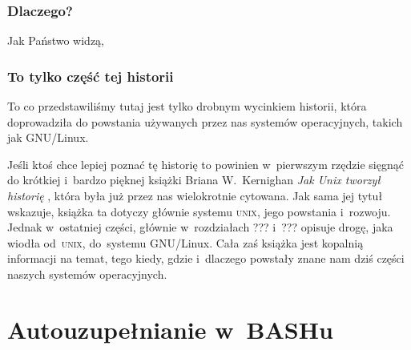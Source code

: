 \documentclass[10pt,t]{beamer}
\begin{document}
\begin{frame}
  \frametitle{Dlaczego?}


  Jak Państwo widzą,

\end{frame}





\begin{frame}
  \frametitle{To tylko część tej historii}


  To co przedstawiliśmy tutaj jest tylko drobnym wycinkiem historii, która
  doprowadziła do powstania używanych przez nas systemów operacyjnych,
  takich jak GNU/Linux.

  Jeśli ktoś chce lepiej poznać tę historię to powinien w~pierwszym rzędzie
  sięgnąć do krótkiej i~bardzo pięknej książki Briana W.~Kernighan
  \textit{Jak Unix tworzył historię}
  \parencite{Kernighan-Jak-Unix-tworzyl-historie-Pub-2021}, która była
  już przez nas wielokrotnie cytowana. Jak sama jej tytuł wskazuje, książka
  ta dotyczy głównie systemu \textsc{unix}, jego powstania i~rozwoju. Jednak
  w~ostatniej części, głównie w~rozdziałach ??? i~??? opisuje drogę, jaka
  wiodła od~\textsc{unix}, do~systemu GNU/Linux. Cała zaś książka jest
  kopalnią informacji na temat, tego kiedy, gdzie i~dlaczego powstały znane
  nam dziś części naszych systemów operacyjnych.

\end{frame}








\section{Autouzupełnianie w~BASHu}
\end{document}
